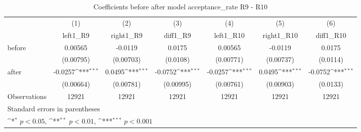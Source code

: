 \begin{table}[!ht]\centering \footnotesize
\def\sym#1{\ifmmode^{#1}\else\(^{#1}\)\fi}
\caption{Coefficients before after model acceptance\_rate R9 - R10}
\begin{tabular}{l*{6}{c}}
\hline\hline
                    &\multicolumn{1}{c}{(1)}&\multicolumn{1}{c}{(2)}&\multicolumn{1}{c}{(3)}&\multicolumn{1}{c}{(4)}&\multicolumn{1}{c}{(5)}&\multicolumn{1}{c}{(6)}\\
                    &\multicolumn{1}{c}{left1\_R9}&\multicolumn{1}{c}{right1\_R9}&\multicolumn{1}{c}{diff1\_R9}&\multicolumn{1}{c}{left1\_R10}&\multicolumn{1}{c}{right1\_R10}&\multicolumn{1}{c}{diff1\_R10}\\
\hline
before              &     0.00565         &     -0.0119         &      0.0175         &     0.00565         &     -0.0119         &      0.0175         \\
                    &   (0.00795)         &   (0.00703)         &    (0.0108)         &   (0.00771)         &   (0.00737)         &    (0.0114)         \\
[1em]
after               &     -0.0257\sym{***}&      0.0495\sym{***}&     -0.0752\sym{***}&     -0.0257\sym{***}&      0.0495\sym{***}&     -0.0752\sym{***}\\
                    &   (0.00664)         &   (0.00781)         &   (0.00995)         &   (0.00761)         &   (0.00903)         &    (0.0133)         \\
\hline
Observations        &       12921         &       12921         &       12921         &       12921         &       12921         &       12921         \\
\hline\hline
\multicolumn{7}{l}{\footnotesize Standard errors in parentheses}\\
\multicolumn{7}{l}{\footnotesize \sym{*} \(p<0.05\), \sym{**} \(p<0.01\), \sym{***} \(p<0.001\)}\\
\end{tabular}
\end{table}
